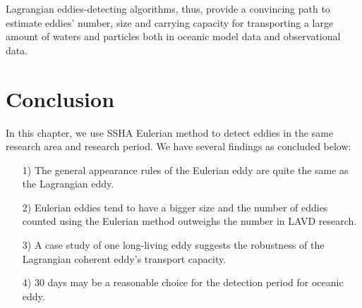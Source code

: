 Lagrangian eddies-detecting algorithms, thus, provide a convincing path to estimate eddies' number, size and carrying capacity for transporting a large amount of waters and particles both in oceanic model data and observational data.

\clearpage

\section{Conclusion}

In this chapter, we use SSHA Eulerian method to detect eddies in the same research area and research period. We have several findings as concluded below:

\begin{itemize}
  \item [1)] 
  The general appearance rules of the Eulerian eddy are quite the same as the Lagrangian eddy.
  \item [2)]
  Eulerian eddies tend to have a bigger size and the number of eddies counted using the Eulerian method outweighs the number in LAVD research.  

  \item [3)]
  A case study of one long-living eddy suggests the robustness of the Lagrangian coherent eddy's  transport capacity.

  \item[4)]
  30 days may be a reasonable choice for the detection period for oceanic eddy. 
\end{itemize}


\newpage

